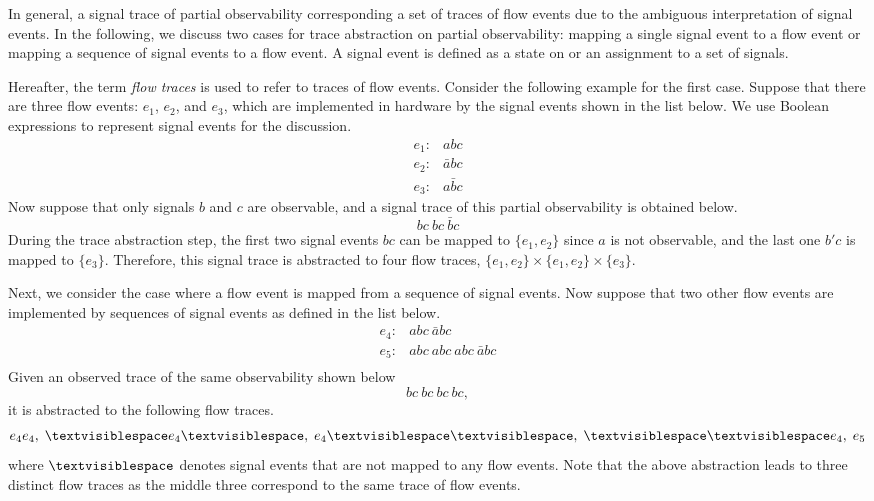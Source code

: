 \documentclass[conference]{IEEEtran}
\begin{document}
In general, a signal trace of partial observability corresponding a set of traces of flow events due to the ambiguous interpretation of signal events.  In the following, we discuss two cases for trace abstraction on partial observability: mapping a single signal event to a flow event or mapping a sequence of signal events to a flow event.  A signal event is defined as a state on or an assignment to a set of signals.  

Hereafter, the term {\em flow traces} is used to refer to traces of flow events. 
Consider the following example for the first case.  Suppose that there are three flow events: $e_1$, $e_2$, and $e_3$, which are implemented in hardware by the signal events shown in the list below.  We use Boolean expressions to represent signal events for the discussion.
\[
\begin{array}{cl}
e_1: & abc\\
e_2: & \bar{a}bc\\
e_3: & a\bar{b}c
\end{array}
\] 
Now suppose that only signals $b$ and $c$ are observable, and a signal trace of this partial observability is obtained below.
\[
bc\ bc \ \bar{b}c
\]
During the trace abstraction step, the first two signal events $bc$ can be mapped to $\{e_1, e_2\}$ since $a$ is not observable, and the last one $b'c$ is mapped to $\{e_3\}$.  Therefore, this signal trace is abstracted to four flow traces, $\{e_1, e_2\} \times \{e_1, e_2\} \times \{e_3\}$.

Next, we consider the case where a flow event is mapped from a sequence of signal events.  Now suppose that two other flow events are implemented by sequences of signal events as defined in the list below.
\[
\begin{array}{cl}
e_4: & abc\ \bar{a}bc\\
e_5: & abc\ abc\ abc\ \bar{a}bc\\
\end{array}
\] 
Given an observed trace of the same observability shown below
\[
bc\ bc\ bc \ bc,
\]
it is abstracted to the following flow traces.
\[
e_4e_4,\; \textvisiblespace e_4 \textvisiblespace,\;  e_4 \textvisiblespace \textvisiblespace,\;  \textvisiblespace \textvisiblespace e_4, \; e_5
\] 
where $\textvisiblespace$ denotes signal events that are not mapped to any flow events.  Note that the above abstraction leads to three distinct flow traces as the middle three correspond to the same trace of flow events. 
\end{document}
